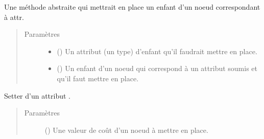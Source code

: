 \documentclass[letterpaper,10pt,french]{sphinxmanual}
\begin{document}
\begin{fulllineitems}

\begin{fulllineitems}
\label{\detokenize{index:StrategyTree.NodeST.set_child_by_attribute}}
Une méthode abstraite qui mettrait en place un enfant d’un noeud correspondant à attr.
\begin{quote}\begin{description}
\item[{Paramètres}] \leavevmode\begin{itemize}
\item {} 
 () \textendash{} Un attribut (un type) d’enfant qu’il faudrait mettre en place.

\item {} 
 ({\hyperref[\detokenize{index:StrategyTree.NodeST}]{}}\sphinxstyleliteralemphasis{\sphinxupquote{, }}) \textendash{} Un enfant d’un noeud qui correspond à un attribut soumis et qu’il faut mettre en place.

\end{itemize}

\end{description}\end{quote}

\end{fulllineitems}


\begin{fulllineitems}
\label{\detokenize{index:StrategyTree.NodeST.set_cost}}
Setter d’un attribut .
\begin{quote}\begin{description}
\item[{Paramètres}] \leavevmode
{} () \textendash{} Une valeur de coût d’un noeud à mettre en place.


\end{description}
\end{quote}
\end{fulllineitems}
\end{fulllineitems}
\end{document}
